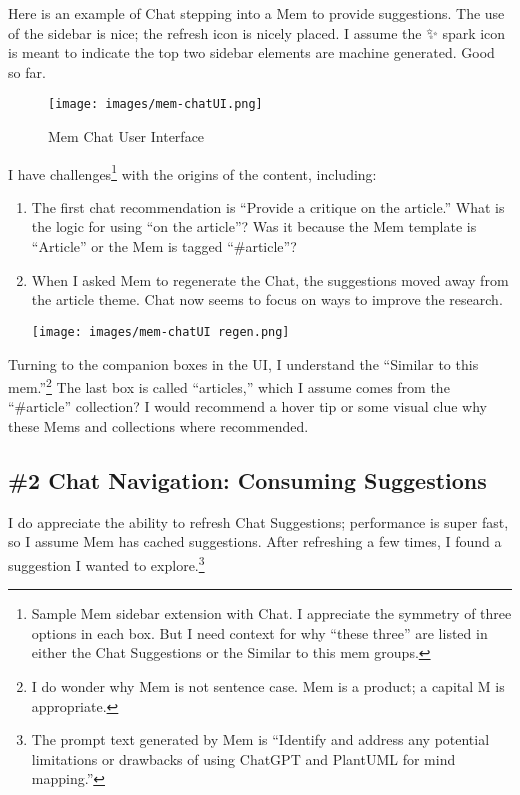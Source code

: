 \documentclass[]{tufte-handout}
\begin{document}
Here is an example of Chat stepping into a Mem to provide suggestions.
The use of the sidebar is nice; the refresh icon is nicely placed. I
assume the ✨ spark icon is meant to indicate the top two sidebar
elements are machine generated. Good so far.

\begin{figure}
\centering
\texttt{[image: images/mem-chatUI.png]}
\caption{Mem Chat User Interface}
\end{figure}

I have challenges\footnote{Sample Mem sidebar extension with Chat. I
  appreciate the symmetry of three options in each box. But I need
  context for why ``these three'' are listed in either the Chat
  Suggestions or the Similar to this mem groups.} with the origins of
the content, including:

\begin{enumerate}
\def\labelenumi{\arabic{enumi}.}
\item
  The first chat recommendation is ``Provide a critique on the
  article.'' What is the logic for using ``on the article''? Was it
  because the Mem template is ``Article'' or the Mem is tagged
  ``\#article''?
\item
  When I asked Mem to regenerate the Chat, the suggestions moved away
  from the article theme. Chat now seems to focus on ways to improve the
  research.

  \texttt{[image: images/mem-chatUI regen.png]}
\end{enumerate}

Turning to the companion boxes in the UI, I understand the ``Similar to
this mem.''\footnote{I do wonder why Mem is not sentence case. Mem is a
  product; a capital M is appropriate.} The last box is called
``articles,'' which I assume comes from the ``\#article'' collection? I
would recommend a hover tip or some visual clue why these Mems and
collections where recommended.

\hypertarget{chat-navigation-consuming-suggestions}{%
\subsection{\#2 Chat Navigation: Consuming
Suggestions}\label{chat-navigation-consuming-suggestions}}

I do appreciate the ability to refresh Chat Suggestions; performance is
super fast, so I assume Mem has cached suggestions. After refreshing a
few times, I found a suggestion I wanted to explore.\footnote{The prompt
  text generated by Mem is ``Identify and address any potential
  limitations or drawbacks of using ChatGPT and PlantUML for mind
  mapping.''}
\end{document}
